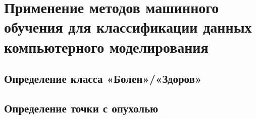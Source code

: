 \newpage
\section{\Large Применение методов машинного обучения для классификации данных компьютерного моделирования}\vspace{-7mm}
\subsection{Определение класса «Болен»/«Здоров»}
\subsection{Определение точки с опухолью}
